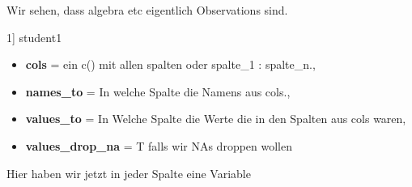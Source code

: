 Wir sehen, dass algebra etc eigentlich Observations sind.
\begin{rcode}{1]}
student1 %
\end{rcode}
\begin{itemize}[noitemsep]
  \item \textbf{cols} = ein c() mit allen spalten oder spalte\_1 : spalte\_n.,
  \item \textbf{names\_to} = In welche Spalte die Namens aus cols.,
  \item \textbf{values\_to} = In Welche Spalte die Werte die in den Spalten aus cols waren,
  \item \textbf{values\_drop\_na} = T falls wir NAs droppen wollen
\end{itemize}
Hier haben wir jetzt in jeder Spalte eine Variable
